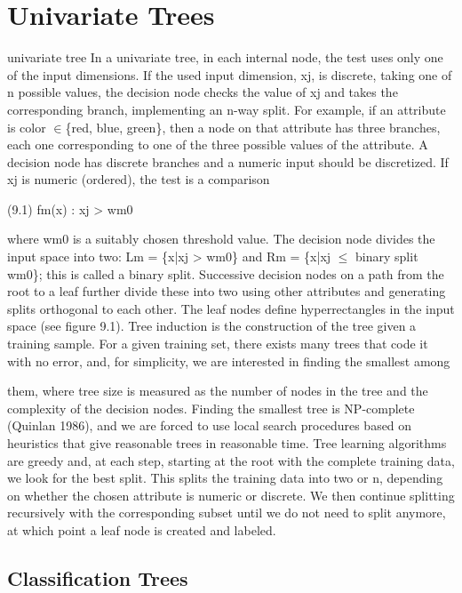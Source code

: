 \section{Univariate Trees}

univariate tree In a univariate tree, in each internal node, the test uses only one of the input dimensions. If the used input dimension, xj, is discrete, taking one of n possible values, the decision node checks the value of xj and takes the corresponding branch, implementing an n-way split. For example, if an attribute is color $\in$\{red, blue, green\}, then a node on that attribute has three branches, each one corresponding to one of the three possible values of the attribute. A decision node has discrete branches and a numeric input should be discretized. If xj is numeric (ordered), the test is a comparison

(9.1) fm(x) : xj > wm0

where wm0 is a suitably chosen threshold value. The decision node divides the input space into two: Lm = \{x|xj > wm0\} and Rm = \{x|xj $\leq$ binary split wm0\}; this is called a binary split. Successive decision nodes on a path from the root to a leaf further divide these into two using other attributes and generating splits orthogonal to each other. The leaf nodes define hyperrectangles in the input space (see figure 9.1). Tree induction is the construction of the tree given a training sample. For a given training set, there exists many trees that code it with no error, and, for simplicity, we are interested in finding the smallest among

them, where tree size is measured as the number of nodes in the tree and the complexity of the decision nodes. Finding the smallest tree is NP-complete (Quinlan 1986), and we are forced to use local search procedures based on heuristics that give reasonable trees in reasonable time. Tree learning algorithms are greedy and, at each step, starting at the root with the complete training data, we look for the best split. This splits the training data into two or n, depending on whether the chosen attribute is numeric or discrete. We then continue splitting recursively with the corresponding subset until we do not need to split anymore, at which point a leaf node is created and labeled.

\subsection{Classification Trees}

